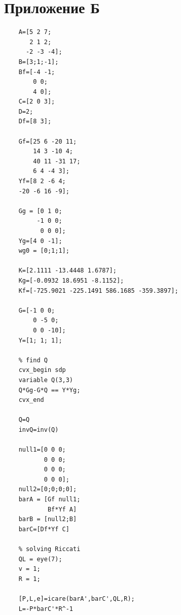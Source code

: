 \documentclass[a4paper, 12pt]{article}
\begin{document}
    \section{Приложение Б}
    \begin{lstlisting}[label=task2, caption={Программа для задания 2}]
    % plant parameters
    A=[5 2 7;
       2 1 2;
      -2 -3 -4];
    B=[3;1;-1];
    Bf=[-4 -1;
        0 0;
        4 0];
    C=[2 0 3];
    D=2;
    Df=[8 3];

    Gf=[25 6 -20 11;
        14 3 -10 4;
        40 11 -31 17;
        6 4 -4 3];
    Yf=[8 2 -6 4;
    -20 -6 16 -9];

    Gg = [0 1 0;
         -1 0 0;
          0 0 0];
    Yg=[4 0 -1];
    wg0 = [0;1;1];

    K=[2.1111 -13.4448 1.6787];
    Kg=[-0.0932 18.6951 -8.1152];
    Kf=[-725.9021 -225.1491 586.1685 -359.3897];

    G=[-1 0 0;
        0 -5 0;
        0 0 -10];
    Y=[1; 1; 1];

    % find Q
    cvx_begin sdp
    variable Q(3,3)
    Q*Gg-G*Q == Y*Yg;
    cvx_end

    Q=Q
    invQ=inv(Q)

    null1=[0 0 0;
           0 0 0;
           0 0 0;
           0 0 0];
    null2=[0;0;0;0];
    barA = [Gf null1;
            Bf*Yf A]
    barB = [null2;B]
    barC=[Df*Yf C]

    % solving Riccati
    QL = eye(7);
    v = 1;
    R = 1;

    [P,L,e]=icare(barA',barC',QL,R);
    L=-P*barC'*R^-1
    \end{lstlisting}
\end{document}
